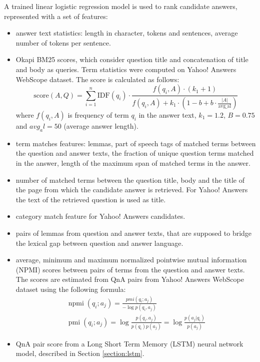\documentclass[]{article}
\begin{document}
A trained linear logistic regression model is used to rank candidate answers, represented with a set of features:
\begin{itemize}
\setlength\itemsep{0mm}
\item answer text statistics: length in character, tokens and sentences, average number of tokens per sentence.
\item Okapi BM25 scores, which consider question title and concatenation of title and body as queries. Term statistics were computed on Yahoo! Answers WebScope dataset. The score is calculated as follows:
\begin{equation*}
\label{equation:bm25}
\text{score}(A,Q) = \sum_{i=1}^{n} \text{IDF}(q_i) \cdot \frac{f(q_i, A) \cdot (k_1 + 1)}{f(q_i, A) + k_1 \cdot (1 - b + b \cdot \frac{|A|}{\text{avg\_al}})}
\end{equation*}
where $f(q_i, A)$ is frequency of term $q_i$ in the answer text, $k_1=1.2$, $B=0.75$ and $avg_al=50$ (average answer length).
\item term matches features: lemmas, part of speech tags of matched terms between the question and answer texts, the fraction of unique question terms matched in the answer, length of the maximum span of matched terms in the answer.
\item number of matched terms between the question title, body and the title of the page from which the candidate answer is retrieved. For Yahoo! Answers the text of the retrieved question is used as title.
\item category match feature for Yahoo! Answers candidates.
\item pairs of lemmas from question and answer texts, that are supposed to bridge the lexical gap between question and answer language.
\item average, minimum and maximum normalized pointwise mutual information (NPMI) scores between pairs of terms from the question and answer texts. The scores are estimated from QnA pairs from Yahoo! Answers WebScope dataset using the following formula:
\begin{equation*}
\begin{split}
\operatorname{npmi}(q_i;a_j) = \frac{pmi(q_i;a_j)}{-\log p(q_i,a_j)}\\
\operatorname{pmi}(q_i;a_j) = \log\frac{p(q_i,a_j)}{p(q_i)p(a_j)} =  \log\frac{p(a_j|q_i)}{p(a_j)}
\end{split}
\end{equation*}
\item QnA pair score from a Long Short Term Memory (LSTM) neural network model, described in Section \ref{section:lstm}.
\end{itemize}
\end{document}
